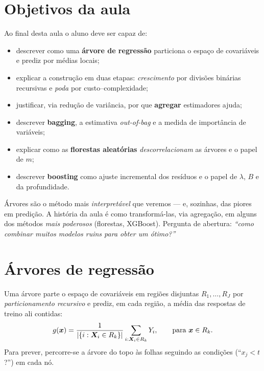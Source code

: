\documentclass[11pt,a4paper]{article}
\begin{document}

\section*{Objetivos da aula}
Ao final desta aula o aluno deve ser capaz de:
\begin{itemize}[leftmargin=1.4cm]
  \item descrever como uma \textbf{árvore de regressão} particiona o espaço de
        covariáveis e prediz por médias locais;
  \item explicar a construção em duas etapas: \emph{crescimento} por divisões
        binárias recursivas e \emph{poda} por custo--complexidade;
  \item justificar, via redução de variância, por que \textbf{agregar} estimadores
        ajuda;
  \item descrever \textbf{bagging}, a estimativa \emph{out-of-bag} e a medida de
        importância de variáveis;
  \item explicar como as \textbf{florestas aleatórias} \emph{descorrelacionam} as
        árvores e o papel de $m$;
  \item descrever \textbf{boosting} como ajuste incremental dos resíduos e o papel
        de $\lambda$, $B$ e da profundidade.
\end{itemize}

\begin{emsala}
Árvores são o método mais \emph{interpretável} que veremos --- e, sozinhas, das
piores em predição. A história da aula é como transformá-las, via agregação, em
alguns dos métodos \emph{mais poderosos} (florestas, XGBoost). Pergunta de
abertura: \emph{``como combinar muitos modelos ruins para obter um ótimo?''}
\end{emsala}

\section{Árvores de regressão}
Uma árvore parte o espaço de covariáveis em regiões disjuntas $R_1,\dots,R_J$ por
\emph{particionamento recursivo} e prediz, em cada região, a média das respostas de
treino ali contidas:
\begin{equation}\label{eq:arvore}
  g(\bm{x}) = \frac{1}{\left\lvert \{i:\bm{X}_i\in R_k\} \right\rvert}\sum_{i:\bm{X}_i\in R_k} Y_i,
  \qquad \text{para } \bm{x}\in R_k .
\end{equation}
Para prever, percorre-se a árvore do topo às folhas seguindo as condições
(``$x_j<t$?'') em cada nó.
\end{document}
